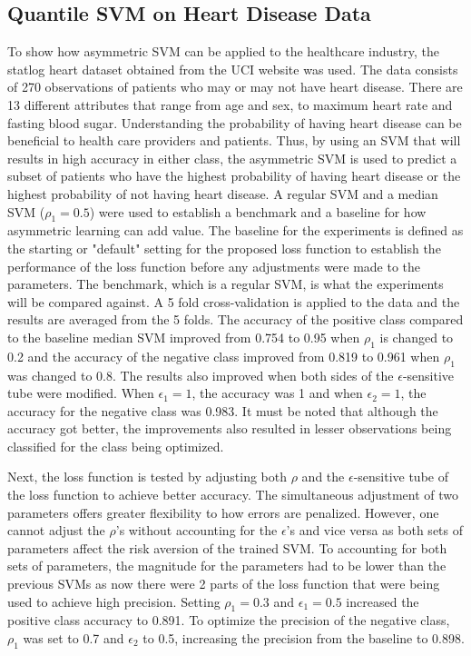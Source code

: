 \subsection{Quantile SVM on Heart Disease Data}
To show how asymmetric SVM can be applied to the healthcare industry, the statlog heart dataset obtained from the UCI website was used. The data consists of 270 observations of patients who may or may not have heart disease. There are 13 different attributes that range from age and sex, to maximum heart rate and fasting blood sugar. Understanding the probability of having heart disease can be beneficial to health care providers and patients. Thus, by using an SVM that will results in high accuracy in either class, the asymmetric SVM is used to predict a subset of patients who have the highest probability of having heart disease or the highest probability of not having heart disease. A regular SVM and a median SVM ($\rho_1=0.5$) were used to establish a benchmark and a baseline for how asymmetric learning can add value. The baseline for the experiments is defined as the starting or "default" setting for the proposed loss function to establish the performance of the loss function before any adjustments were made to the parameters. The benchmark, which is a regular SVM, is what the experiments will be compared against. A 5 fold cross-validation is applied to the data and the results are averaged from the 5 folds. The accuracy of the positive class compared to the baseline median SVM improved from 0.754 to 0.95 when $\rho_1$ is changed to 0.2 and the accuracy of the negative class improved from 0.819 to 0.961 when $\rho_1$ was changed to 0.8. The results also improved when both sides of the $\epsilon$-sensitive tube were modified. When $\epsilon_1=1$, the accuracy was 1 and when $\epsilon_2=1$, the accuracy for the negative class was 0.983. It must be noted that although the accuracy got better, the improvements also resulted in lesser observations being classified for the class being optimized.

Next, the loss function is tested by adjusting both $\rho$ and the $\epsilon$-sensitive tube of the loss function to achieve better accuracy. The simultaneous adjustment of two parameters offers greater flexibility to how errors are penalized. However, one cannot adjust the $\rho$'s without accounting for the $\epsilon$'s and vice versa as both sets of parameters affect the risk aversion of the trained SVM. To accounting for both sets of parameters, the magnitude for the parameters had to be lower than the previous SVMs as now there were 2 parts of the loss function that were being used to achieve high precision. Setting $\rho_1=0.3$ and $\epsilon_1=0.5$ increased the positive class accuracy to 0.891. To optimize the precision of the negative class, $\rho_1$ was set to 0.7 and $\epsilon_2$ to 0.5, increasing the precision from the baseline to 0.898. 

